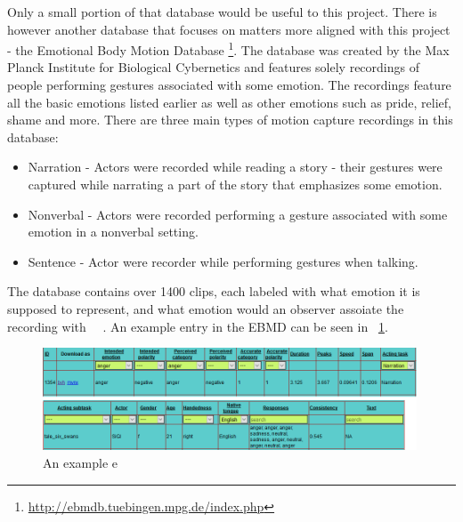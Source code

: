 Only a small portion of that database would be useful to this project. There is however another database that focuses on matters more aligned with this project - the Emotional Body Motion Database \footnote{\url{http://ebmdb.tuebingen.mpg.de/index.php}}. The database was created by the Max Planck Institute for Biological Cybernetics and features solely recordings of people performing gestures associated with some emotion. The recordings feature all the basic emotions listed earlier as well as other emotions such as pride, relief, shame and more. There are three main types of motion capture recordings in this database:
\begin{itemize}
\item Narration - Actors were recorded while reading a story - their gestures were captured while narrating a part of the story that emphasizes some emotion.
\item Nonverbal - Actors were recorded performing a gesture associated with some emotion in a nonverbal setting.
\item Sentence - Actor were recorder while performing gestures when talking.
\end{itemize}
The database contains over 1400 clips, each labeled with what emotion it is supposed to represent, and what emotion would an observer assoiate the recording with ~\cite{planck1}~\cite{planck2}. An example entry in the EBMD can be seen in ~\ref{fig:ebmd1}.

\begin{figure}[!ht]
\centerline{\includegraphics[width = 30em]{img/emo1.png}}
\caption{An example e}\label{fig:ebmd1}
\end{figure}

